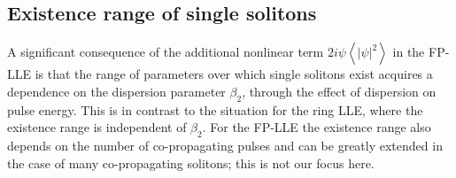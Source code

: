 %


\subsection{Existence range of single solitons}
A significant consequence of the additional nonlinear term $2i\psi\left<|\psi|^2\right>$ in the FP-LLE is that the range of parameters over which single solitons exist acquires a dependence on the dispersion parameter $\beta_2$, through the effect of dispersion on pulse energy.  This is in contrast to the situation for the ring LLE, where the existence range is independent of $\beta_2$. For the FP-LLE the existence range also depends on the number of co-propagating pulses and can be greatly extended in the case of many co-propagating solitons; this is not our focus here.

